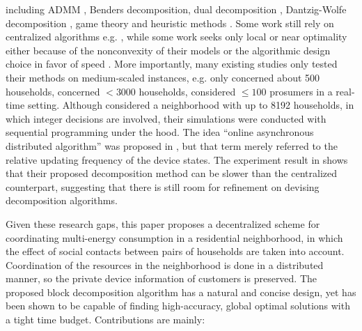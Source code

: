 \documentclass[journal]{IEEEtran}
\begin{document}
including ADMM \cite{wang2023}\!\!\cite{wu2025}, Benders decomposition\cite{liu2024}, dual decomposition \cite{chenxin2021}\!\!\cite{kim2013},
Dantzig-Wolfe decomposition \cite{dw2019}, game theory \cite{orlm2016}\!\!\cite{preference2024}
and heuristic methods \cite{heuristic2019}.
Some work still rely on centralized algorithms e.g. \cite{community2024}\!\!\cite{preference2024},
while some work seeks only local or near optimality either because of the nonconvexity of
their models \cite{chenxin2021} or the algorithmic design choice in favor of speed \cite{fast2016}.
More importantly, many existing studies only tested their methods on medium-scaled instances,
e.g. \cite{chenxin2021}\!\!\cite{orlm2016} only concerned about 500 households, \cite{fast2016}
concerned $<3000$ households, \cite{wu2025} considered $\le 100$ prosumers in a real-time setting.
Although \cite{dw2019} considered a neighborhood with up to 8192 households, in which
integer decisions are involved, their simulations were conducted with sequential programming
under the hood.
The idea ``online asynchronous distributed algorithm'' was proposed in \cite{async2020},
but that term merely referred to the relative updating frequency of the device states.
The experiment result in \cite{wang2023} shows that their proposed decomposition method can be slower than the centralized counterpart, suggesting that there is still room for refinement on devising decomposition algorithms.
\par
Given these research gaps, this paper proposes a decentralized scheme for coordinating
multi-energy consumption in a residential neighborhood, in which the effect of social
contacts between pairs of households are taken into account.
Coordination of the resources in the neighborhood is done in a distributed manner,
so the private device information of customers is preserved.
The proposed block decomposition algorithm has a natural and concise design, yet has
been shown to be capable of finding high-accuracy, global optimal solutions with a tight time budget.
Contributions are mainly:
\end{document}
